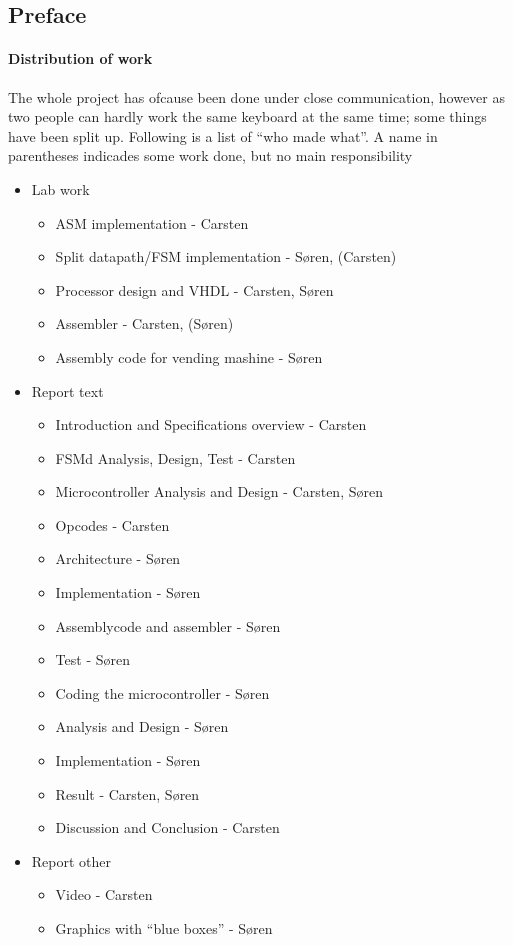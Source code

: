 \subsection*{Preface}

\paragraph{Distribution of work}
The whole project has ofcause been done under close communication, however as
two people can hardly work the same keyboard at the same time; some things have
been split up. Following is a list of ``who made what''. A name in parentheses
indicades some work done, but no main responsibility
\begin{itemize}
  \item Lab work
  \begin{itemize}
    \item ASM implementation - Carsten
    \item Split datapath/FSM implementation - S\o ren, (Carsten)
    
    \item Processor design and VHDL - Carsten, S\o ren
    \item Assembler - Carsten, (S\o ren)
    \item Assembly code for vending mashine - S\o ren
  \end{itemize}
  \item Report text
  \begin{itemize}
    \item Introduction and Specifications overview - Carsten
    \item FSMd Analysis, Design, Test - Carsten 
    \item Microcontroller Analysis and Design - Carsten, S\o ren
    \item Opcodes - Carsten
    \item Architecture - S\o ren
    \item Implementation - S\o ren
    \item Assemblycode and assembler - S\o ren
    \item Test - S\o ren
    \item Coding the microcontroller - S\o ren
    \item Analysis and Design - S\o ren
    \item Implementation - S\o ren
    \item Result - Carsten, S\o ren
    \item Discussion and Conclusion - Carsten
  \end{itemize}
  \item Report other
  \begin{itemize}
    \item Video - Carsten
    \item Graphics with ``blue boxes'' - S\o ren
  \end{itemize}
\end{itemize}
